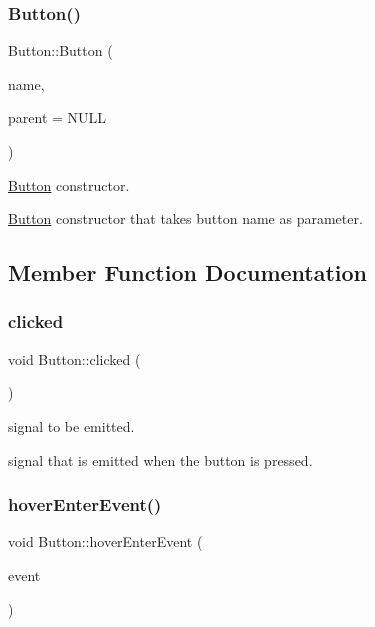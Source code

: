\subsubsection{\texorpdfstring{Button()}{Button()}}
{\footnotesize\ttfamily Button\+::\+Button (\begin{DoxyParamCaption}\item[{Q\+String}]{name,  }\item[{Q\+Graphics\+Item $\ast$}]{parent = {\ttfamily NULL} }\end{DoxyParamCaption})}



\hyperlink{classButton}{Button} constructor. 

\hyperlink{classButton}{Button} constructor that takes button name as parameter. 

\subsection{Member Function Documentation}
\mbox{\label{classButton_a9e7ab4152cb1e7e3beb7f2842f32670c}} 
\subsubsection{\texorpdfstring{clicked}{clicked}}
{\footnotesize\ttfamily void Button\+::clicked (\begin{DoxyParamCaption}{ }\end{DoxyParamCaption})\hspace{0.3cm}{\ttfamily [signal]}}



signal to be emitted. 

signal that is emitted when the button is pressed. \mbox{\label{classButton_a633a9684818bc5d300a622a00064f09c}} 
\subsubsection{\texorpdfstring{hover\+Enter\+Event()}{hoverEnterEvent()}}
{\footnotesize\ttfamily void Button\+::hover\+Enter\+Event (\begin{DoxyParamCaption}\item[{Q\+Graphics\+Scene\+Hover\+Event $\ast$}]{event }\end{DoxyParamCaption})}



